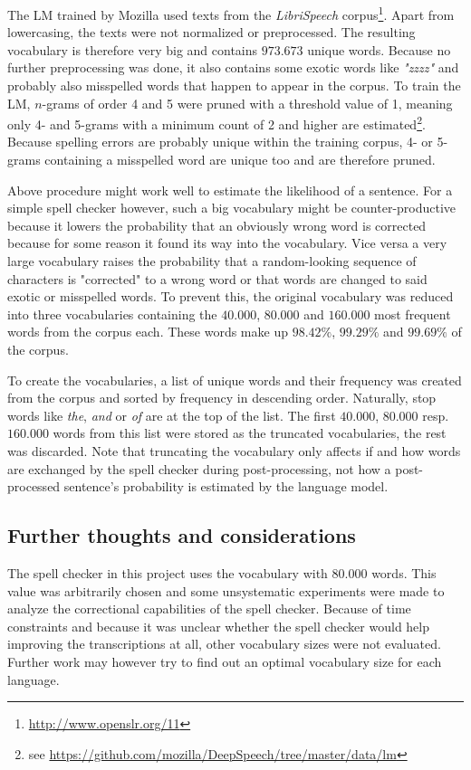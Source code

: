 The \ac{LM} trained by Mozilla used texts from the \textit{LibriSpeech} corpus\footnote{\url{http://www.openslr.org/11}}. Apart from lowercasing, the texts were not normalized or preprocessed. The resulting vocabulary is therefore very big and contains $973.673$ unique words. Because no further preprocessing was done, it also contains some exotic words like \textit{"zzzz"} and probably also misspelled words that happen to appear in the corpus. To train the \ac{LM}, $n$-grams of order 4 and 5 were pruned with a threshold value of 1, meaning only 4- and 5-grams with a minimum count of 2 and higher are estimated\footnote{see \url{https://github.com/mozilla/DeepSpeech/tree/master/data/lm}}. Because spelling errors are probably unique within the training corpus, 4- or 5-grams containing a misspelled word are unique too and are therefore pruned. 

Above procedure might work well to estimate the likelihood of a sentence. For a simple spell checker however, such a big vocabulary might be counter-productive because it lowers the probability that an obviously wrong word is corrected because for some reason it found its way into the vocabulary. Vice versa a very large vocabulary raises the probability that a random-looking sequence of characters is "corrected" to a wrong word or that words are changed to said exotic or misspelled words. To prevent this, the original vocabulary was reduced into three vocabularies containing the $40.000$, $80.000$ and $160.000$ most frequent words from the corpus each. These words make up $98.42\%$, $99.29\%$ and $99.69\%$ of the corpus.

To create the vocabularies, a list of unique words and their frequency was created from the corpus and sorted by frequency in descending order. Naturally, stop words like \textit{the}, \textit{and} or \textit{of} are at the top of the list. The first $40.000$, $80.000$ resp. $160.000$ words from this list were stored as the truncated vocabularies, the rest was discarded. Note that truncating the vocabulary only affects if and how words are exchanged by the spell checker during post-processing, not how a post-processed sentence's probability is estimated by the language model.

\subsection{Further thoughts and considerations}

The spell checker in this project uses the vocabulary with $80.000$ words. This value was arbitrarily chosen and some unsystematic experiments were made to analyze the correctional capabilities of the spell checker. Because of time constraints and because it was unclear whether the spell checker would help improving the transcriptions at all, other vocabulary sizes were not evaluated. Further work may however try to find out an optimal vocabulary size for each language.